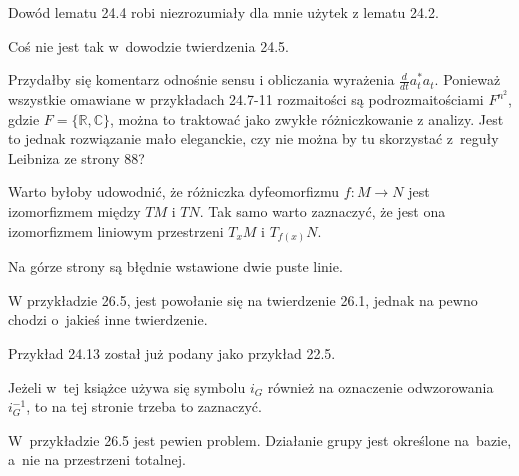 \documentclass[a4paper,11pt]{article}
\begin{document}
\vspace{\spaceFour}


\start {} Dowód lematu 24.4 robi niezrozumiały dla mnie użytek
z lematu 24.2.

\vspace{\spaceFour}


\start {} Coś nie jest tak w~dowodzie twierdzenia 24.5.

\vspace{\spaceFour}


\start {} Przydałby się komentarz odnośnie sensu i obliczania
wyrażenia $\frac{ d }{ dt } a^{ * }_{ t } a_{ t }$. Ponieważ wszystkie
omawiane w przykładach 24.7-11 rozmaitości są podrozmaitościami
$F^{ n^{ 2 } }$, gdzie $F = \{ \mathbb{ R }, \mathbb{ C } \}$, można
to traktować jako zwykłe różniczkowanie z analizy. Jest to jednak
rozwiązanie mało eleganckie, czy nie można by tu skorzystać z~reguły
Leibniza ze strony 88?

\vspace{\spaceFour}


\start Warto byłoby udowodnić, że różniczka dyfeomorfizmu
$f : M \to N$ jest izomorfizmem między $TM$ i $TN$. Tak samo warto
zaznaczyć, że jest ona izomorfizmem liniowym przestrzeni $T_{ x }M$ i
$T_{ f( x ) }N$.

\vspace{\spaceFour}


\start {} Na górze strony są błędnie wstawione dwie puste
linie.

\vspace{\spaceFour}


\start {} W przykładzie 26.5, jest powołanie się na twierdzenie
26.1, jednak na pewno chodzi o~jakieś inne twierdzenie.

\vspace{\spaceFour}


\start {} Przykład 24.13 został już podany jako przykład 22.5.

\vspace{\spaceFour}


\start {} Jeżeli w~tej książce używa się symbolu $i_{ G }$
również na oznaczenie odwzorowania $i_{ G }^{ -1 }$, to na tej stronie
trzeba to zaznaczyć.

\vspace{\spaceFour}


\start {} W~przykładzie 26.5 jest pewien problem. Działanie
grupy jest określone na~bazie, a~nie na przestrzeni totalnej.
\end{document}
